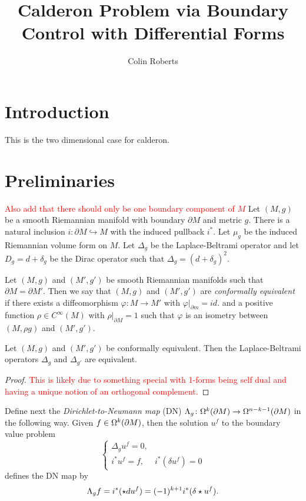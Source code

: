 \documentclass[12pt]{article}
\title{Calderon Problem via Boundary Control with Differential Forms}
\author{Colin Roberts}
\begin{document}
\section{Introduction}
This is the two dimensional case for calderon.

\section{Preliminaries}

\textcolor{red}{Also add that there should only be one boundary component of $M$}
Let $(M,g)$ be a smooth Riemannian manifold with boundary $\partial M$ and metric $g$.  There is a natural inclusion $i \colon \partial M \hookrightarrow M$ with the induced pullback $i^*$.  Let $\mu_g$ be the induced Riemannian volume form on $M$. Let $\Delta_g$ be the Laplace-Beltrami operator and let $D_g = d+\delta_g$ be the Dirac operator such that $\Delta_g = (d+\delta_g)^2$. 


\begin{definition}
	Let $(M,g)$ and $(M',g')$ be smooth Riemannian manifolds such that $\partial M = \partial M'$. Then we say that $(M,g)$ and $(M',g')$ are \emph{conformally equivalent} if there exists a diffeomorphism $\varphi \colon M \to M'$ with $\varphi \vert_{\partial m} = id.$ and a positive function $\rho \in C^\infty (M)$ with $\rho \vert_{\partial M} = 1$ such that $\varphi$ is an isometry between $(M,\rho g)$ and $(M',g')$.
\end{definition}

\begin{theorem}
	Let $(M,g)$ and $(M',g')$ be conformally equivalent.  Then the Laplace-Beltrami operators $\Delta_{g}$ and $\Delta_{g'}$ are equivalent.
\end{theorem}
\begin{proof}
\textcolor{red}{This is likely due to something special with 1-forms being self dual and having a unique notion of an orthogonal complement.}
\end{proof}

Define next the \emph{Dirichlet-to-Neumann map} (DN) $\Lambda_g \colon \Omega^{k}(\partial M) \to \Omega^{n-k-1}(\partial M)$ in the following way.  Given $f\in \Omega^{k}(\partial M)$, then the solution $u^f$ to the boundary value problem
\[
\begin{cases} \Delta_g u^f = 0,\\ i^*u^f = f, & i^*(\delta u^f) = 0 \end{cases}
\]
defines the DN map by 
\[
\Lambda_g f = i^*(\star d u^f) = (-1)^{k+1}i^*(\delta \star u^f).
\]
\end{document}
